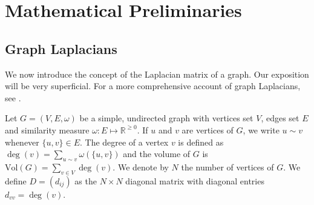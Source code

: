 \chapter{Mathematical Preliminaries}
\label{cha:math-prel}
\section{Graph Laplacians}
\label{sec:graph-laplacians}
We now introduce the concept of the Laplacian matrix of a graph. Our
exposition will be very superficial. For a more comprehensive account
of graph Laplacians, see
\citep{chung05:_laplac_cheeg,cvetkovic80:_spect_graph_theor_applic}.

Let $G = (V,E,\omega)$ be a simple, undirected graph with vertices set
$V$, edges set $E$ and similarity measure $\omega \colon E \mapsto
\mathbb{R}^{\geq 0}$. If $u$ and $v$ are vertices of $G$, we write $u
\sim v$ whenever $\{u,v\} \in E$. The degree of a vertex $v$ is
defined as $\deg(v) = \sum_{u \sim v}{\omega(\{u,v\})}$ and the volume
of $G$ is $\mathrm{Vol}(G) = \sum_{v \in V}{\deg(v)}$.  We denote by
$N$ the number of vertices of $G$. We define $D = (d_{ij})$ as the $N
\times N$ diagonal matrix with diagonal entries $d_{vv} = \deg(v)$.

